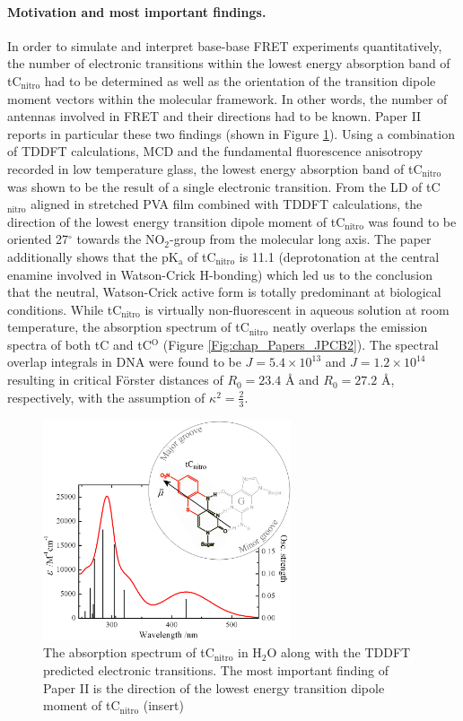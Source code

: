  \paragraph{Motivation and most important findings.} In order to simulate and interpret base-base FRET experiments quantitatively, the number of electronic transitions within the lowest energy absorption band of tC$_\mathrm{nitro}$ had to be determined as well as the orientation of the transition dipole moment vectors within the molecular framework. In other words, the number of antennas involved in FRET and their directions had to be known. Paper II reports in particular these two findings (shown in Figure \ref{Fig:chap_Papers_JPCB}). Using a combination of TDDFT calculations, MCD and the fundamental fluorescence anisotropy recorded in low temperature glass, the lowest energy absorption band of tC$_\mathrm{nitro}$ was shown to be the result of a single electronic transition. From the LD of tC$_\mathrm{nitro}$ aligned in stretched PVA film combined with TDDFT calculations, the direction of the lowest energy transition dipole moment of tC$_\mathrm{nitro}$ was found to be oriented 27$^\circ$ towards the NO$_2$-group from the molecular long axis. The paper additionally shows that the pK$_\mathrm{a}$ of tC$_\mathrm{nitro}$ is 11.1 (deprotonation at the central enamine involved in Watson-Crick H-bonding) which led us to the conclusion that the neutral, Watson-Crick active form is totally predominant at biological conditions. While tC$_\mathrm{nitro}$ is virtually non-fluorescent in aqueous solution at room temperature, the absorption spectrum of tC$_\mathrm{nitro}$ neatly overlaps the emission spectra of both tC and tC$^\mathrm{O}$ (Figure \ref{Fig:chap_Papers_JPCB2}). The spectral overlap integrals in DNA were found to be $J=5.4\times 10^{13}$ and $J=1.2\times10^{14}$ resulting in critical Förster distances of $R_0=23.4$ Å and $R_0=27.2$ Å, respectively, with the assumption of $\kappa^2 = \frac{2}{3}$.
\begin{figure}
    \centering
        \includegraphics[width=0.65\textwidth]{adds//jpcb_fig.jpg}
    \captionsetup{width=.95\textwidth}
    \caption{The absorption spectrum of tC$_\mathrm{nitro}$ in H$_2$O along with the TDDFT predicted electronic transitions. The most important finding of Paper II is the direction of the lowest energy transition dipole moment of tC$_\mathrm{nitro}$ (insert)}
    \label{Fig:chap_Papers_JPCB}
\end{figure}
